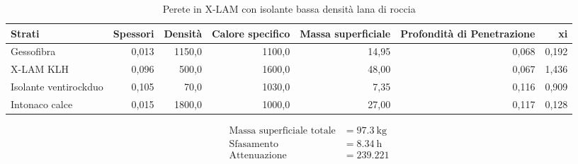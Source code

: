\begin{table}
\centering
\caption{Perete in X-LAM con isolante bassa densità lana di roccia}
\begin{tabular}{lrrrrrr}
\toprule
                Strati & Spessori & Densità & Calore specifico & Massa superficiale & Profondità di Penetrazione &     xi \\
\midrule
            Gessofibra &    0,013 &  1150,0 &           1100,0 &              14,95 &                      0,068 &  0,192 \\
             X-LAM KLH &    0,096 &   500,0 &           1600,0 &              48,00 &                      0,067 &  1,436 \\
 Isolante ventirockduo &    0,105 &    70,0 &           1030,0 &               7,35 &                      0,116 &  0,909 \\
        Intonaco calce &    0,015 &  1800,0 &           1000,0 &              27,00 &                      0,117 &  0,128 \\
\bottomrule
\end{tabular}
\end{table}

\begin{flushleft}
\begin{align*}
\text{Massa superficiale totale} &= \SI{97.3}{\kilo\gram}\\
\text{Sfasamento} &= \SI{8.34}{\hour}\\
\text{Attenuazione} &= \SI{239.221}{}
\end{align*}
\end{flushleft}
